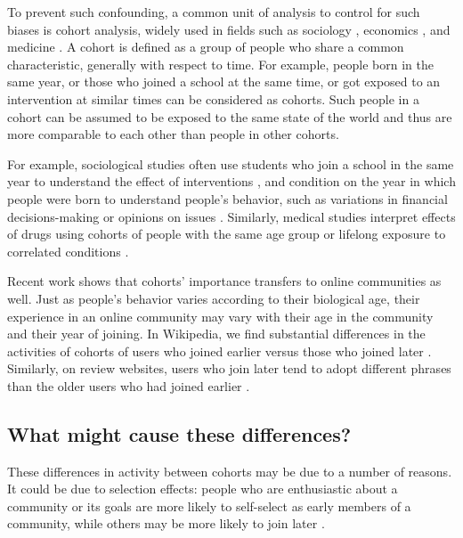 To prevent such confounding, a common unit of analysis to control for such biases is cohort analysis, widely used in fields such as sociology \cite{Mason2012,Glenn2005}, economics \cite{Attanasio1993,Beldona2005}, and medicine \cite{Howartz1996,Davis2010}. A cohort is defined as a group of people who share a common characteristic, generally with respect to time. For example, people born in the same year, or those who joined a school at the same time, or got exposed to an intervention at similar times can be considered as cohorts. Such people in a cohort can be assumed to be exposed to the same state of the world and thus are more comparable to each other than people in other cohorts. 

For example, sociological studies often use students who join a school in the same year to understand the effect of interventions \cite{Goyette2008,Alexander2012}, and condition on the year in which people were born to understand people's  behavior, such as variations in financial decisions-making \cite{Attanasio1993} or opinions on issues \cite{Firebaugh1988,Jennings1996}. Similarly, medical studies interpret effects of drugs using cohorts of people with the same age group or lifelong exposure to correlated conditions \cite{Howartz1996,Davis2010}.  

Recent work shows that cohorts' importance transfers to online communities as well. Just as people's behavior varies according to their biological age, their experience in an online community may vary with their age in the community and their year of joining. In Wikipedia, we find substantial differences in the activities of cohorts of users who joined earlier versus those who joined later \cite{Welser2011}. Similarly, on review websites, users who join later tend to adopt different phrases than the older users who had joined earlier \cite{Danescu-niculescu-mizil2013}.

\subsection{What might cause these differences?}

These differences in activity between cohorts may be due to a number of reasons. It could be due to selection effects: people who are enthusiastic about a community or its goals are more likely to self-select as early members of a community, while others may be more likely to join later \cite{Li2008}. 

